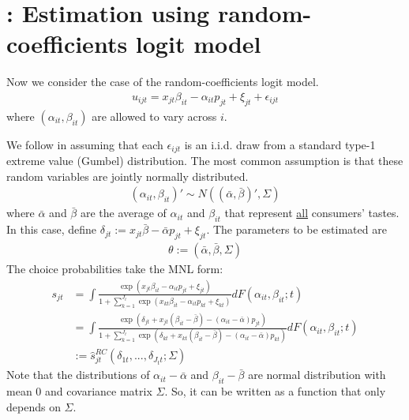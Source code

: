 \documentclass[11pt]{elegantbook}
\begin{document}
\section{\cite{berry1995automobile}: Estimation using random-coefficients logit model}
Now we consider the case of the random-coefficients logit model.
\begin{equation}
    \begin{aligned}
        u_{ijt}=x_{jt}\beta_{it}-\alpha_{it}p_{jt}+\xi_{jt}+\epsilon_{ijt}
    \end{aligned}
    \nonumber
\end{equation}
where $(\alpha_{it},\beta_{it})$ are allowed to vary across $i$.


We follow \cite{berry1995automobile} in assuming that each $\epsilon_{ijt}$ is an i.i.d. draw from a standard type-1 extreme value (Gumbel) distribution. The most common assumption is that these random variables are jointly normally distributed.
\begin{equation}
    \begin{aligned}
        (\alpha_{it},\beta_{it})'\sim N\left((\bar{\alpha},\bar{\beta})',\Sigma\right)
    \end{aligned}
    \nonumber
\end{equation}
where $\bar{\alpha}$ and $\bar{\beta}$ are the average of $\alpha_{it}$ and $\beta_{it}$ that represent \underline{all} consumers' tastes. In this case, define $\delta_{jt}:=x_{jt}\bar{\beta}-\bar{\alpha}p_{jt}+\xi_{jt}$. The parameters to be estimated are
\begin{equation}
    \begin{aligned}
        \theta:=(\bar{\alpha},\bar{\beta},\Sigma)
    \end{aligned}
    \nonumber
\end{equation}
The choice probabilities take the MNL form:
\begin{equation}
    \begin{aligned}
        s_{jt}&=\int \frac{\exp(x_{jt}\beta_{it}-\alpha_{it}p_{jt}+\xi_{jt})}{1+\sum_{k=1}^{J_t}\exp(x_{kt}\beta_{it}-\alpha_{it}p_{kt}+\xi_{kt})}d F(\alpha_{it},\beta_{it};t)\\
        &=\int \frac{\exp(\delta_{jt}+x_{jt}(\beta_{it}-\bar{\beta})-(\alpha_{it}-\bar{\alpha})p_{jt})}{1+\sum_{k=1}^{J_t}\exp(\delta_{kt}+x_{kt}(\beta_{it}-\bar{\beta})-(\alpha_{it}-\bar{\alpha})p_{kt})}d F(\alpha_{it},\beta_{it};t)\\
        &:=\hat{s}_{jt}^{RC}\left(\delta_{1t},...,\delta_{J_tt};\Sigma\right)
    \end{aligned}
    \nonumber
\end{equation}
Note that the distributions of $\alpha_{it}-\bar{\alpha}$ and $\beta_{it}-\bar{\beta}$ are normal distribution with mean $0$ and covariance matrix $\Sigma$. So, it can be written as a function that only depends on $\Sigma$.
\end{document}
